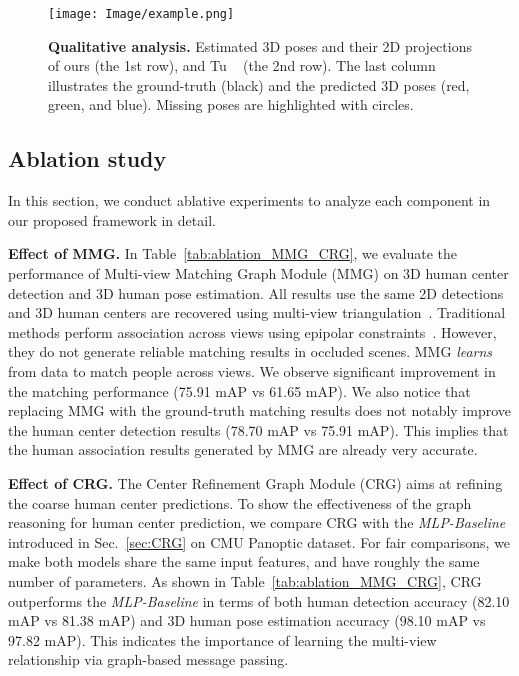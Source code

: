 \documentclass[10pt,twocolumn,letterpaper]{article}
\begin{document}
\begin{figure*}[ht]
	\centering
	\texttt{[image: Image/example.png]}
	\caption{\textbf{Qualitative analysis.} Estimated 3D poses and their 2D projections of ours (the 1st row), and Tu \etal~\cite{tu2020voxelpose} (the 2nd row). 
	The last column illustrates the ground-truth (black) and the predicted 3D poses (red, green, and blue). Missing poses are highlighted with circles.}
	\label{fig:qualitative}
\end{figure*}

\subsection{Ablation study}

In this section, we conduct ablative experiments to analyze each component in our proposed framework in detail. 

\textbf{Effect of MMG.}
In Table~\ref{tab:ablation_MMG_CRG}, we evaluate the performance of Multi-view Matching Graph Module (MMG) on 3D human center detection and 3D human pose estimation. All results use the same 2D detections and 3D human centers are recovered using multi-view triangulation~\cite{andrew2001multiple}. Traditional methods perform association across views using epipolar constraints~\cite{kadkhodamohammadi2021generalizable}. However, they do not generate reliable matching results in occluded scenes. MMG \emph{learns} from data to match people across views.
We observe significant improvement in the matching performance (75.91 mAP vs 61.65 mAP). We also notice that replacing MMG with the ground-truth matching results does not notably improve the human center detection results (78.70 mAP vs 75.91 mAP). This implies that the human association results generated by MMG are already very accurate. 

\textbf{Effect of CRG.}
The Center Refinement Graph Module (CRG) aims at refining the coarse human center predictions. To show the effectiveness of the graph reasoning for human center prediction, we compare CRG with the \emph{MLP-Baseline} introduced in Sec.~\ref{sec:CRG} on CMU Panoptic dataset. For fair comparisons, we make both models share the same input features, and have roughly the same number of parameters. As shown in Table~\ref{tab:ablation_MMG_CRG}, CRG outperforms the \emph{MLP-Baseline} in terms of both human detection accuracy (82.10 mAP vs 81.38 mAP) and 3D human pose estimation accuracy (98.10 mAP vs 97.82 mAP).
This indicates the importance of learning the multi-view relationship via graph-based message passing.
\end{document}
